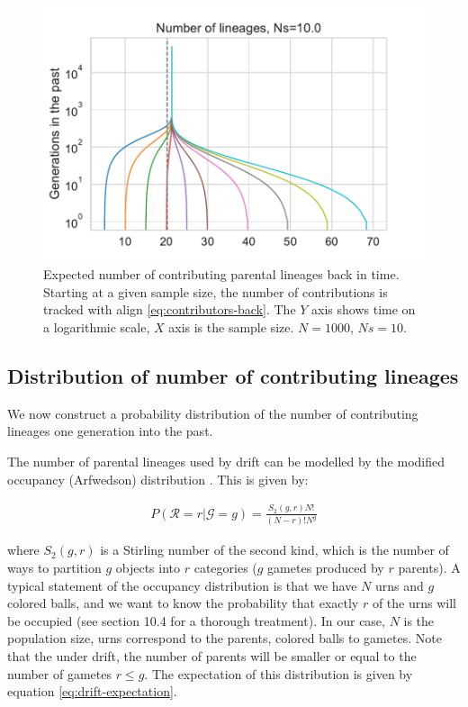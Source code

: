 \documentclass[review]{elsarticle}
\begin{document}
\begin{figure}
  \centering
  \includegraphics[]{fig/bell-plot.pdf}
  \caption{Expected number of contributing parental lineages back in time. Starting at a given
    sample size, the number of contributions is tracked with align \ref{eq:contributors-back}.
    The $Y$ axis shows time on a logarithmic scale, $X$ axis is the sample size. $N=1000$, $Ns=10$.}
  \label{fig:bell-plot}
\end{figure}


\subsection{Distribution of number of contributing lineages}
\label{subsec:distribution}

We now construct a probability distribution of the number of contributing lineages one generation
into the past.

The number of parental lineages used by drift can be modelled by the modified occupancy
(Arfwedson) distribution \citep{Wakeley2009,ONeill2019,JohnsonEtAl2005}. This is given by:

\begin{align}
  \label{eq:occupancy}
  P(\mathcal{R}=r|\mathcal{G}=g) = \frac{S_2(g,r) N!}{(N-r)! N^g}
\end{align}

where $S_2(g,r)$ is a Stirling number of the second kind, which is the number of ways to partition
$g$ objects into $r$ categories ($g$ gametes produced by $r$ parents). A typical statement of the
occupancy distribution is that we have $N$ urns and $g$ colored balls, and we want to know the
probability that exactly $r$ of the urns will be occupied (see \cite{JohnsonEtAl2005} section 10.4
for a thorough treatment). In our case, $N$ is the population size, urns correspond to the parents,
colored balls to gametes. Note that the under drift, the number of parents will be smaller or equal
to the number of gametes $r \le g$. The expectation of this distribution is given by equation
\eqref{eq:drift-expectation}.
\end{document}
